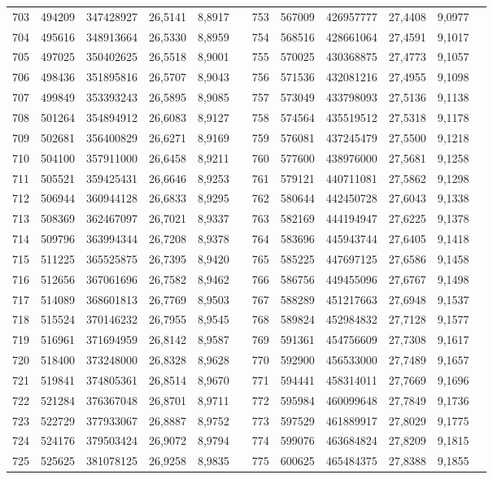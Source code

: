 \begin{longtable}{p{.17\linewidth}*{11}{S}}
703&494209&347428927&26,5141&8,8917&&753&567009&426957777&27,4408&9,0977\\
704&495616&348913664&26,5330&8,8959&&754&568516&428661064&27,4591&9,1017\\
705&497025&350402625&26,5518&8,9001&&755&570025&430368875&27,4773&9,1057\\
706&498436&351895816&26,5707&8,9043&&756&571536&432081216&27,4955&9,1098\\
707&499849&353393243&26,5895&8,9085&&757&573049&433798093&27,5136&9,1138\\
708&501264&354894912&26,6083&8,9127&&758&574564&435519512&27,5318&9,1178\\
709&502681&356400829&26,6271&8,9169&&759&576081&437245479&27,5500&9,1218\\
710&504100&357911000&26,6458&8,9211&&760&577600&438976000&27,5681&9,1258\\
711&505521&359425431&26,6646&8,9253&&761&579121&440711081&27,5862&9,1298\\
712&506944&360944128&26,6833&8,9295&&762&580644&442450728&27,6043&9,1338\\
713&508369&362467097&26,7021&8,9337&&763&582169&444194947&27,6225&9,1378\\
714&509796&363994344&26,7208&8,9378&&764&583696&445943744&27,6405&9,1418\\
715&511225&365525875&26,7395&8,9420&&765&585225&447697125&27,6586&9,1458\\
716&512656&367061696&26,7582&8,9462&&766&586756&449455096&27,6767&9,1498\\
717&514089&368601813&26,7769&8,9503&&767&588289&451217663&27,6948&9,1537\\
718&515524&370146232&26,7955&8,9545&&768&589824&452984832&27,7128&9,1577\\
719&516961&371694959&26,8142&8,9587&&769&591361&454756609&27,7308&9,1617\\
720&518400&373248000&26,8328&8,9628&&770&592900&456533000&27,7489&9,1657\\
721&519841&374805361&26,8514&8,9670&&771&594441&458314011&27,7669&9,1696\\
722&521284&376367048&26,8701&8,9711&&772&595984&460099648&27,7849&9,1736\\
723&522729&377933067&26,8887&8,9752&&773&597529&461889917&27,8029&9,1775\\
724&524176&379503424&26,9072&8,9794&&774&599076&463684824&27,8209&9,1815\\
725&525625&381078125&26,9258&8,9835&&775&600625&465484375&27,8388&9,1855\\

\end{longtable}
